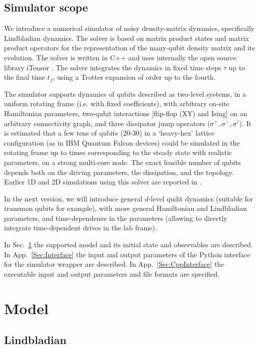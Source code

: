 \documentclass[aps,10pt,pra,twocolumn,groupedaddress,floatfix,superscriptaddress,showpacs,showkeys,amsfonts]{revtex4-2}
\newcommand{\seq}[1]{Sec.~\ref{#1}}
\newcommand{\app}[1]{App.~\ref{#1}}
\begin{document}
\subsection{Simulator scope}

We introduce a numerical simulator of noisy density-matrix dynamics, specifically Lindbladian dynamics. The solver is based on matrix product states and matrix product operators for the representation of the many-qubit density matrix and its evolution. The solver is written in C++ and uses internally the open source library iTensor \cite{}. The solver integrates the dynamics in fixed time steps $\tau$ up to  the final time $t_f$, using a Trotter expansion of order up to the fourth.

The simulator supports dynamics of qubits described as two-level systems, in a uniform rotating frame (i.e. with fixed coefficients), with arbitrary on-site Hamiltonian parameters, two-qubit interactions [flip-flop (XY) and Ising] on an arbitrary connectivity graph, and three dissipator jump operators ($\sigma^+, \sigma^-, \sigma^z$). It is estimated that a few tens of qubits (20-30) in a `heavy-hex' lattice configuration (as in IBM Quantum Falcon devices) could be simulated in the rotating frame up to times corresponding to the steady state with realistic parameters, on a strong multi-core node. The exact feasible number of qubits depends both on the driving parameters, the dissipation, and the topology. Earlier 1D and 2D simulations using this solver are reported in \cite{bidzhiev_out--equilibrium_2017,bimodality,etatheory}.

In the next version, we will introduce general $d$-level qudit dynamics (suitable for transmon qubits for example), with more general Hamiltonian and Lindbladian parameters, and time-dependence in the parameters (allowing to directly integrate time-dependent drives in the lab frame).

In \seq{Sec:Model} the supported model and its initial state and observables are described. In \app{Sec:Interface} the input and output parameters of the Python interface for the simulator wrapper are described. In \app{Sec:CppInterface} the executable input and output parameters and file formats are specified.

\section{Model}\label{Sec:Model}

\subsection{Lindbladian}
 
\end{document}
